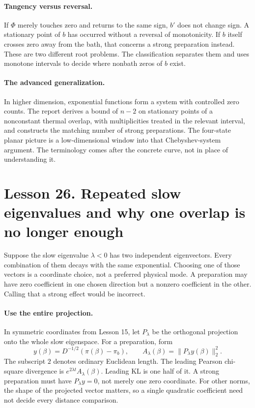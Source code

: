 \paragraph{Tangency versus reversal.}
If $\Phi$ merely touches zero and returns to the same sign, $b'$ does not
change sign. A stationary point of $b$ has occurred without a reversal of
monotonicity. If $b$ itself crosses zero away from the bath, that concerns
a strong preparation instead. These are two different root problems.
The classification separates them and uses monotone intervals to decide
where nonbath zeros of $b$ exist.

\paragraph{The advanced generalization.}
In higher dimension, exponential functions form a system with controlled
zero counts. The report derives a bound of $n-2$ on stationary points of a
nonconstant thermal overlap, with multiplicities treated in the relevant
interval, and constructs the matching number of strong preparations.
The four-state planar picture is a low-dimensional window into that
Chebyshev-system argument. The terminology comes after the concrete curve,
not in place of understanding it.

\clearpage
\section*{Lesson 26. Repeated slow eigenvalues and why one overlap is no longer enough}
Suppose the slow eigenvalue $\lambda<0$ has two independent eigenvectors.
Every combination of them decays with the same exponential. Choosing one
of those vectors is a coordinate choice, not a preferred physical mode.
A preparation may have zero coefficient in one chosen direction but a
nonzero coefficient in the other. Calling that a strong effect would be
incorrect.

\paragraph{Use the entire projection.}
In symmetric coordinates from Lesson 15, let $P_\lambda$ be the orthogonal
projection onto the whole slow eigenspace. For a preparation, form
\[
y(\beta)=D^{-1/2}(\pi(\beta)-\pi_b),
\qquad A_\lambda(\beta)=\|P_\lambda y(\beta)\|_2^2.
\]
The subscript $2$ denotes ordinary Euclidean length. The leading Pearson
chi-square divergence is
$e^{2\lambda t}A_\lambda(\beta)$. Leading KL is one half of it. A strong
preparation must have $P_\lambda y=0$, not merely one zero coordinate.
For other norms, the shape of the projected vector matters, so a single
quadratic coefficient need not decide every distance comparison.

